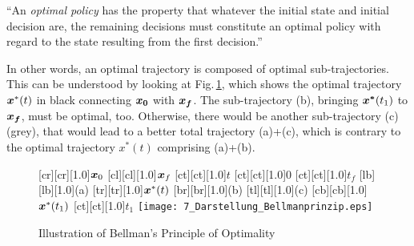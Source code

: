 \begin{definition}
“An \textit{optimal policy} has the property that whatever the initial state and initial decision are, the remaining decisions must constitute an optimal policy with regard to the state resulting from the first decision.” 
\end{definition}
In other words, an optimal trajectory is composed of optimal sub-trajectories. This can be understood by looking at Fig.\,\ref{fig:Darstellung_Bellmanprinzip}, which shows the optimal trajectory $\boldsymbol{x}^\ast (t)$ in black connecting $\boldsymbol{x_0}$ with $\boldsymbol{x_f}$. The sub-trajectory (b), bringing $\boldsymbol{x^\ast} (t_1 )$ to $\boldsymbol{x_f}$, must be optimal, too. Otherwise, there would be another sub-trajectory (c) (grey), that would lead to a better total trajectory (a)+(c), which is contrary to the optimal trajectory $x^\ast (t)$ comprising (a)+(b).
\begin{figure}[h]
	[cr][cr][1.0]{$\boldsymbol{x}_0$}
	[cl][cl][1.0]{$\boldsymbol{x}_f$}
	[ct][ct][1.0]{$t$}
	[ct][ct][1.0]{$0$}
	[ct][ct][1.0]{$t_f$}
	[lb][lb][1.0]{(a)}
	[tr][tr][1.0]{$\boldsymbol{x}^\ast(t)$}
	[br][br][1.0]{(b)}
	[tl][tl][1.0]{(c)}
	[cb][cb][1.0]{$\boldsymbol{x}^\ast(t_1)$}
	[ct][ct][1.0]{$t_1$}
	\centering
 \texttt{[image: 7\_Darstellung\_Bellmanprinzip.eps]}
	\caption[Bellman’s Principle of Optimality]{Illustration of Bellman’s Principle of Optimality} 
	\label{fig:Darstellung_Bellmanprinzip}
\end{figure} 

